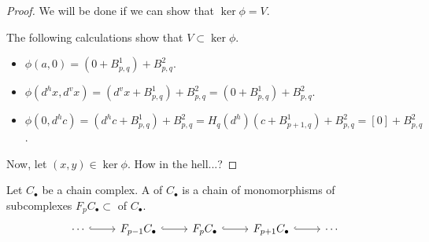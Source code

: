 \documentclass[main.tex]{subfiles}
\begin{document}
\begin{proof}
  We will be done if we can show that $\ker \phi = V$.

  The following calculations show that $V \subset \ker \phi$.
  \begin{itemize}
    \item $\phi(a, 0) = (0 + B^{1}_{p, q}) + B^{2}_{p, q}$.

    \item $\phi(d^{h}x, d^{v}x) = (d^{v}x + B^{1}_{p, q}) + B^{2}_{p, q} = (0 + B^{1}_{p, q}) + B^{2}_{p, q}$.

    \item $\phi(0, d^{h}c) = (d^{h}c + B^{1}_{p, q}) + B^{2}_{p, q} = H_{q}(d^{h})(c + B^{1}_{p+1, q}) + B^{2}_{p, q} = [0] + B^{2}_{p, q}$.
  \end{itemize}

  Now, let $(x, y) \in \ker \phi$. How in the hell...?
\end{proof}

\begin{definition}[filtration]
  \label{def:filtration}
  Let $C_{\bullet}$ be a chain complex. A  of $C_{\bullet}$ is a chain of monomorphisms of subcomplexes $F_{p}C_{\bullet} \subset$ of $C_{\bullet}$.
  \begin{equation*}
    \begin{tikzcd}
      \cdots
      \arrow[r, hook]
      & F_{p-1}C_{\bullet} 
      \arrow[r, hook]
      & F_{p}C_{\bullet}
      \arrow[r, hook]
      & F_{p+1}C_{\bullet}
      \arrow[r, hook]
      & \cdots
    \end{tikzcd}
  \end{equation*}
\end{definition}

%
%
\end{document}
